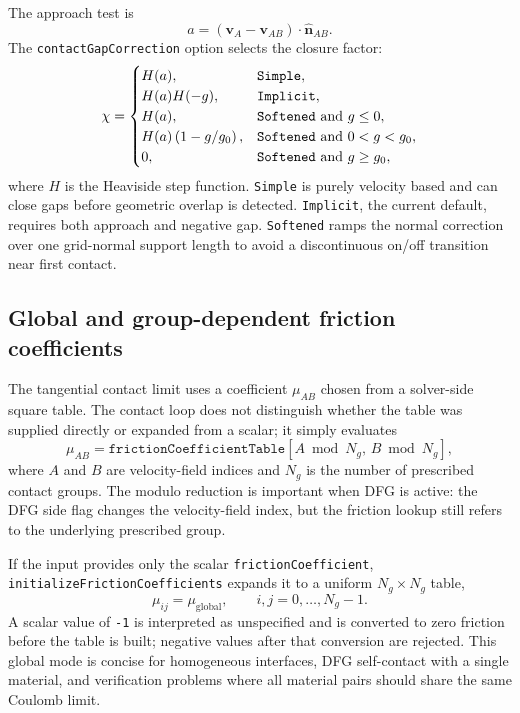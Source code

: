 The approach test is
\begin{equation}
  a=(\mathbf{v}_A-\mathbf{v}_{AB})\cdot\hat{\mathbf{n}}_{AB}.
\end{equation}
The \texttt{contactGapCorrection} option selects the closure factor:
\begin{equation}
\chi =
\begin{cases}
  H(a), & \texttt{Simple},\\
  H(a)H(-g), & \texttt{Implicit},\\
  H(a), & \texttt{Softened}\ \hbox{and}\ g\le 0,\\
  H(a)\left(1-g/g_0\right), & \texttt{Softened}\ \hbox{and}\ 0<g<g_0,\\
  0, & \texttt{Softened}\ \hbox{and}\ g\ge g_0,
\end{cases}
\label{eq:contact-gap-closure-factor}
\end{equation}
where $H$ is the Heaviside step function.  \texttt{Simple} is purely velocity based and can close gaps before geometric overlap is detected.  \texttt{Implicit}, the current default, requires both approach and negative gap.  \texttt{Softened} ramps the normal correction over one grid-normal support length to avoid a discontinuous on/off transition near first contact.

\subsection{Global and group-dependent friction coefficients}
\label{subsec:contact-friction-coefficients}

The tangential contact limit uses a coefficient $\mu_{AB}$ chosen from a solver-side square table.  The contact loop does not distinguish whether the table was supplied directly or expanded from a scalar; it simply evaluates
\begin{equation}
  \mu_{AB}=\texttt{frictionCoefficientTable}
  \left[A\bmod N_g,\,B\bmod N_g\right],
  \label{eq:contact-friction-table-index}
\end{equation}
where $A$ and $B$ are velocity-field indices and $N_g$ is the number of prescribed contact groups.  The modulo reduction is important when DFG is active: the DFG side flag changes the velocity-field index, but the friction lookup still refers to the underlying prescribed group.

If the input provides only the scalar \texttt{frictionCoefficient}, \texttt{initializeFrictionCoefficients} expands it to a uniform $N_g\times N_g$ table,
\begin{equation}
  \mu_{ij}=\mu_{\mathrm{global}},\qquad i,j=0,\ldots,N_g-1.
\end{equation}
A scalar value of \texttt{-1} is interpreted as unspecified and is converted to zero friction before the table is built; negative values after that conversion are rejected.  This global mode is concise for homogeneous interfaces, DFG self-contact with a single material, and verification problems where all material pairs should share the same Coulomb limit.

